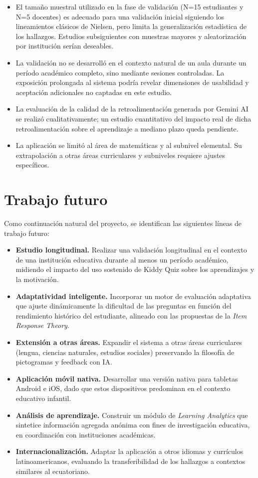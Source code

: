 \begin{itemize}[leftmargin=*]
\item El tamaño muestral utilizado en la fase de validación (N=15 estudiantes y N=5 docentes) es adecuado para una validación inicial siguiendo los lineamientos clásicos de Nielsen, pero limita la generalización estadística de los hallazgos. Estudios subsiguientes con muestras mayores y aleatorización por institución serían deseables.
\item La validación no se desarrolló en el contexto natural de un aula durante un período académico completo, sino mediante sesiones controladas. La exposición prolongada al sistema podría revelar dimensiones de usabilidad y aceptación adicionales no captadas en este estudio.
\item La evaluación de la calidad de la retroalimentación generada por Gemini AI se realizó cualitativamente; un estudio cuantitativo del impacto real de dicha retroalimentación sobre el aprendizaje a mediano plazo queda pendiente.
\item La aplicación se limitó al área de matemáticas y al subnivel elemental. Su extrapolación a otras áreas curriculares y subniveles requiere ajustes específicos.
\end{itemize}

\section{Trabajo futuro}

Como continuación natural del proyecto, se identifican las siguientes líneas de trabajo futuro:

\begin{itemize}[leftmargin=*]
\item \textbf{Estudio longitudinal.} Realizar una validación longitudinal en el contexto de una institución educativa durante al menos un período académico, midiendo el impacto del uso sostenido de Kiddy Quiz sobre los aprendizajes y la motivación.
\item \textbf{Adaptatividad inteligente.} Incorporar un motor de evaluación adaptativa que ajuste dinámicamente la dificultad de las preguntas en función del rendimiento histórico del estudiante, alineado con las propuestas de la \textit{Item Response Theory}.
\item \textbf{Extensión a otras áreas.} Expandir el sistema a otras áreas curriculares (lengua, ciencias naturales, estudios sociales) preservando la filosofía de pictogramas y feedback con IA.
\item \textbf{Aplicación móvil nativa.} Desarrollar una versión nativa para tabletas Android e iOS, dado que estos dispositivos predominan en el contexto educativo infantil.
\item \textbf{Análisis de aprendizaje.} Construir un módulo de \textit{Learning Analytics} que sintetice información agregada anónima con fines de investigación educativa, en coordinación con instituciones académicas.
\item \textbf{Internacionalización.} Adaptar la aplicación a otros idiomas y currículos latinoamericanos, evaluando la transferibilidad de los hallazgos a contextos similares al ecuatoriano.
\end{itemize}
